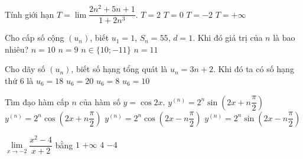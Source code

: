 \begin{ex}%
Tính giới hạn $T=\lim\dfrac{2n^2+5n+1}{1+2n^3}$.
\choice
{$T=2$}
{\True $T=0$}
{$T=-2$}
{$T=+\infty$}
\end{ex}

\begin{ex}%
Cho cấp số cộng $(u_n)$, biết $u_1=1$, $S_n=55$, $d=1$. Khi đó giá trị của $n$ là bao nhiêu?
\choice
{\True $n=10$}
{$n=9$}
{$n\in\{10;-11\}$}
{$n=11$}
\end{ex}

\begin{ex}%
Cho dãy số $(u_n)$, biết số hạng tổng quát là $u_n=3n+2$. Khi đó ta có số hạng thứ $6$ là
\choice
{$u_6=18$}
{\True $u_6=20$}
{$u_6=8$}
{$u_6=10$}
\end{ex} 

\begin{ex}%
Tìm đạo hàm cấp $n$ của hàm số $y=\cos2x$.
\choice
{$y^{(n)}=2^n\sin\left(2x+n\dfrac{\pi}{2}\right)$}
{\True $y^{(n)}=2^n\cos\left(2x+n\dfrac{\pi}{2}\right)$}
{$y^{(n)}=2^n\cos\left(2x-n\dfrac{\pi}{2}\right)$}
{$y^{(n)}=2^n\sin\left(2x-n\dfrac{\pi}{2}\right)$}
\end{ex}

\begin{ex}%
	$\displaystyle \lim \limits_{x \to -2} \dfrac{x^2-4}{x+2}$ bằng
	\choice
	{$1 $}
	{ $ +\infty$}
	{ $4 $}
	{\True $-4 $}
\end{ex}

